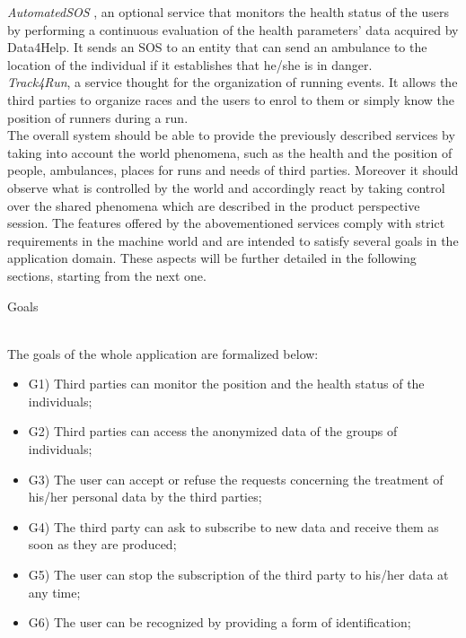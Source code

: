 \documentclass{article}
\begin{document}
\begin{legal}
\begin{legal}
\begin{legal}
{\textit{AutomatedSOS }, an optional service that monitors the health status of the users by performing a continuous evaluation of the health parameters' data acquired by Data4Help. It sends an SOS to an entity that can send an ambulance to the location of the individual if it establishes that he/she is in danger.\\
\textit{Track4Run}, a service thought for the organization of running events. It allows the third parties to organize races and the users to enrol to them or simply know the position of runners during a run.\\
The overall system should be able to provide the previously described services by taking into account the world phenomena, such as the health and the position of people, ambulances, places for runs and needs of third parties. Moreover it should observe what is controlled by the world and accordingly react by taking control over the shared phenomena which are described in the product perspective session.
The features offered by the abovementioned services comply with strict requirements in the machine world and are intended to satisfy several goals in the application domain. These aspects will be further detailed in the following sections, starting from the next one.
			}\\
			\newpage
			\item Goals \\\\
			{\normalfont
			The goals of the whole application are formalized below:\\
				\begin{itemize}
				\item G1) Third parties can monitor the position and the health status of the individuals;\\
				\item G2) Third parties can access the anonymized data of the groups of individuals;\\
				\item G3) The user can accept or refuse the requests concerning the treatment of his/her personal data by the third parties;\\
				\item G4) The third party can ask to subscribe to new data and receive them as soon as they are produced;\\
				\item G5) The user can stop the subscription of the third party to his/her data at any time;\\
				\item G6) The user can be recognized by providing a form of identification;\\

\end{itemize}}
\end{legal}
\end{legal}
\end{legal}
\end{document}
